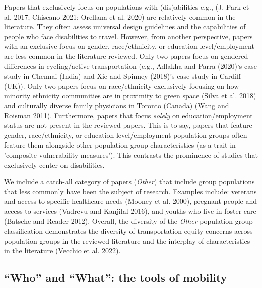 \documentclass[12pt, oneside]{report}
\begin{document}
Papers that exclusively focus on populations with (dis)abilities e.g.,
(J. Park et al. 2017; Chiscano 2021; Orellana et al. 2020) are
relatively common in the literature. They often assess universal design
guidelines and the capabilities of people who face disabilities to
travel. However, from another perspective, papers with an exclusive
focus on gender, race/ethnicity, or education level/employment are less
common in the literature reviewed. Only two papers focus on gendered
differences in cycling/active transportation (e.g., Adlakha and Parra
(2020)`s case study in Chennai (India) and Xie and Spinney (2018)'s case
study in Cardiff (UK)). Only two papers focus on race/ethnicity
exclusively focusing on how minority ethnicity communities are in
proximity to green space (Silva et al. 2018) and culturally diverse
family physicians in Toronto (Canada) (Wang and Roisman 2011).
Furthermore, papers that focus \emph{solely} on education/employment
status are not present in the reviewed papers. This is to say, papers
that feature gender, race/ethnicity, or education level/employment
population groups often feature them alongside other population group
characteristics (as a trait in 'composite vulnerability measures'). This
contrasts the prominence of studies that exclusively center on
disabilities.

We include a catch-all category of papers (\emph{Other}) that include
group populations that less commonly have been the subject of research.
Examples include: veterans and access to specific-healthcare needs
(Mooney et al. 2000), pregnant people and access to services (Vadrevu
and Kanjilal 2016), and youths who live in foster care (Batsche and
Reader 2012). Overall, the diversity of the \emph{Other} population
group classification demonstrates the diversity of transportation-equity
concerns across population groups in the reviewed literature and the
interplay of characteristics in the literature (Vecchio et al. 2022).

\hypertarget{who-and-what-the-tools-of-mobility}{%
\subsection{``Who'' and ``What'': the tools of
mobility}\label{who-and-what-the-tools-of-mobility}}
\end{document}
